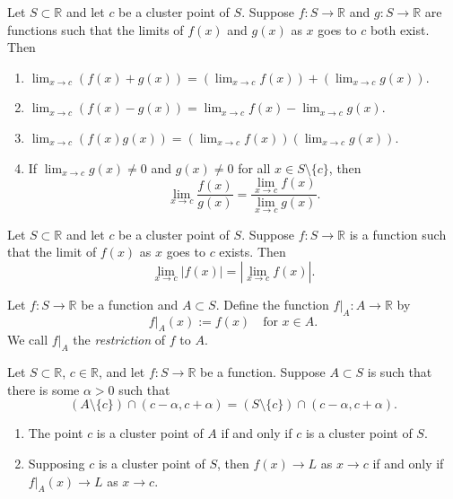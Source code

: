 \documentclass[../main.tex]{subfiles}
\begin{document}
    \begin{proposition}
        Let $S \subset \mathbb{R}$ and let $c$ be a cluster point of $S$. Suppose $f : S \to \mathbb{R}$ and $g : S \to \mathbb{R}$ are functions such that the limits of $f(x)$ and $g(x)$ as $x$ goes to $c$ both exist. Then
    \begin{enumerate}
        \item $\lim_{x\to c} (f(x) + g(x)) = \left(\lim_{x\to c} f(x)\right) + \left(\lim_{x\to c} g(x)\right)$.
        \item $\lim_{x\to c} (f(x) - g(x)) = \lim_{x\to c} f(x) - \lim_{x\to c} g(x)$.
        \item $\lim_{x\to c} (f(x)g(x)) = \left(\lim_{x\to c} f(x)\right) \left(\lim_{x\to c} g(x)\right)$.
        \item If $\lim_{x\to c} g(x) \neq 0$ and $g(x) \neq 0$ for all $x \in S \setminus \{c\}$, then
            \[
            \lim_{x\to c} \frac{f(x)}{g(x)} = \frac{\lim_{x\to c} f(x)}{\lim_{x\to c} g(x)}.
            \]
    \end{enumerate}
    \end{proposition}
        
    \begin{proposition}
        Let $S \subset \mathbb{R}$ and let $c$ be a cluster point of $S$. Suppose $f : S \to \mathbb{R}$ is a function such that the limit of $f(x)$ as $x$ goes to $c$ exists. Then
        \[
        \lim_{x\to c} |f(x)| = \left| \lim_{x\to c} f(x) \right|.
        \]
    \end{proposition}
        
    \begin{definition}
        Let $f : S \to \mathbb{R}$ be a function and $A \subset S$. Define the function $f|_A : A \to \mathbb{R}$ by
        \[
        f|_A(x) := f(x) \quad \text{for } x \in A.
        \]
        We call $f|_A$ the \textit{restriction} of $f$ to $A$.
    \end{definition}
        
    \begin{proposition}
        Let $S \subset \mathbb{R}$, $c \in \mathbb{R}$, and let $f : S \to \mathbb{R}$ be a function. Suppose $A \subset S$ is such that there is some $\alpha > 0$ such that
        \[
        (A \setminus \{c\}) \cap (c - \alpha, c + \alpha) = (S \setminus \{c\}) \cap (c - \alpha, c + \alpha).
        \]
    \begin{enumerate}
        \item The point $c$ is a cluster point of $A$ if and only if $c$ is a cluster point of $S$.
        \item Supposing $c$ is a cluster point of $S$, then $f(x) \to L$ as $x \to c$ if and only if $f|_A(x) \to L$ as $x \to c$.
    \end{enumerate}
    \end{proposition}
        
\end{document}
